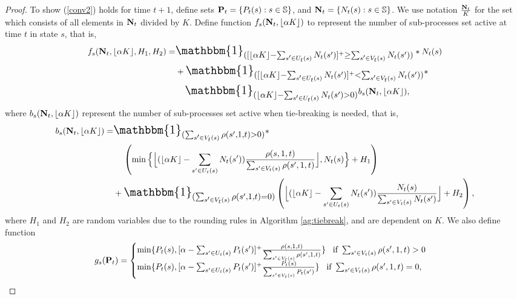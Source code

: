 \begin{proof}{}
To show (\ref{conv2}) holds for time $t+1$, define sets $\mathbf{P}_t = \{P_t(s):s\in\mathbb{S}\}$, and $\mathbf{N}_t=\{N_t(s):s\in\mathbb{S}\}$. We use notation $\frac{\mathbf{N}_{t}}{K}$ for the set which consists of all elements in $\mathbf{N}_t$ divided by $K$. Define function $f_s(\mathbf{N}_t,\lfloor\alpha K\rfloor)$ to represent the number of sub-processes set active at time $t$ in state $s$, that is,
\begin{align}
f_s(\Nv_t,\lfloor\alpha K\rfloor,H_1,H_2) =& \mathlarger{\mathlarger{\mathbbm{1}_{([\lfloor\alpha K\rfloor-\sum_{s'\in U_{t}(s)}N_{t}(s')]^+ \geq \sum_{s'\in V_{t}(s)}N_{t}(s'))}}}
*N_{t}(s)\nonumber\\
&+\mathlarger{\mathlarger{\mathbbm{1}_{([\lfloor\alpha K\rfloor-\sum_{s'\in U_{t}(s)}N_{t}(s')]^+ < \sum_{s'\in V_{t}(s)}N_{t}(s'))}}}*\nonumber\\
&\hspace{4mm}\mathlarger{\mathlarger{\mathbbm{1}_{(\lfloor\alpha K\rfloor-\sum_{s'\in U_{t}(s)}N_{t}(s')>0)}}}b_s(\Nv_t,\lfloor\alpha K\rfloor), 
\end{align}
where $b_s(\mathbf{N}_t,\lfloor\alpha K\rfloor)$ represent the number of sub-processes set active when tie-breaking is needed, that is,
\begin{align}
b_s(\Nv_t,\lfloor\alpha K\rfloor) = & \mathlarger{\mathlarger{\mathbbm{1}_{(\sum_{s'\in V_{t}(s)}\rho(s',1,t)>0)}}} * \nonumber\\
&\hspace{4mm}\left(\min\Big\{\Big\lfloor (\lfloor\alpha K\rfloor-\sum_{s'\in U_{t}(s)}N_{t}(s'))\frac{\rho(s,1,t)}{\sum_{s'\in V_{t}(s)}\rho(s',1,t)}\Big\rfloor,N_{t}(s)\Big\}+H_1\right)\nonumber\\
& + \mathlarger{\mathlarger{\mathbbm{1}_{(\sum_{s'\in V_{t}(s)}\rho(s',1,t)=0)}}}\left(\Big\lfloor (\lfloor\alpha K\rfloor-\sum_{s'\in U_{t}(s)}N_{t}(s'))\frac{N_{t}(s)}{\sum_{s'\in V_{t}(s)}N_{t}(s')}\Big\rfloor+H_2\right),
\end{align}
where $H_1$ and $H_2$ are random variables due to the rounding rules in Algorithm \ref{ag:tiebreak}, and are dependent on $K$.
We also define function
\begin{equation}
g_s(\mathbf{P}_t) = 
\begin{cases}
\min\{P_t(s),[\alpha - \sum_{s'\in U_t(s)}P_t(s')]^+\frac{\rho(s,1,t)}{\sum_{s'\in V_{t}(s)}\rho(s',1,t)}\} \;\;\; \text{if } \sum_{s'\in V_{t}(s)}\rho(s',1,t) >0 \\
\min\{P_t(s),[\alpha - \sum_{s'\in U_t(s)}P_t(s')]^+\frac{P_t(s)}{\sum_{s'\in V_{t}(s)}P_t(s')}\} \;\;\; \text{if } \sum_{s'\in V_{t}(s)}\rho(s',1,t) =0 ,

\end{cases}
\end{equation}
\end{proof}
